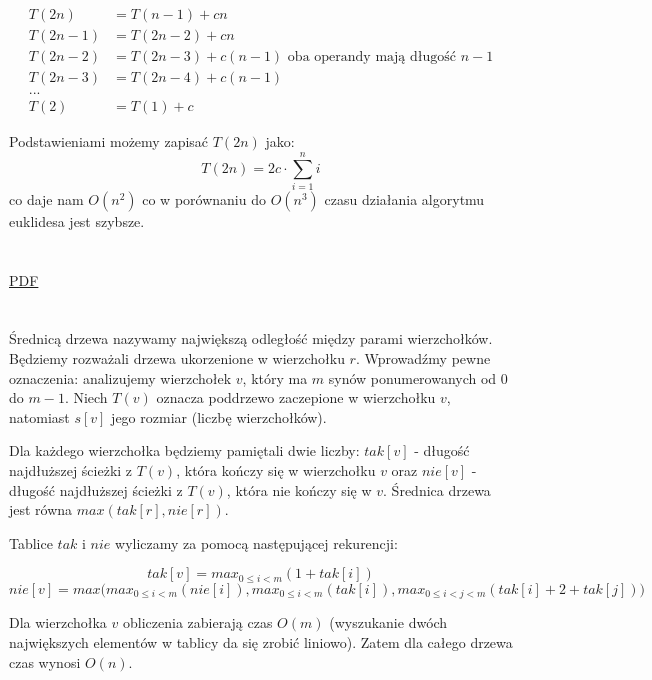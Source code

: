 \begin{equation*}
\begin{split}
T(2n) & = T(n-1) + cn \\
T(2n -1) & = T(2n - 2) + cn \\
T(2n - 2) & = T(2n - 3) + c(n-1)  \text{   oba operandy mają długość $n-1$} \\
T(2n - 3) & = T(2n - 4) + c(n-1) \\
... &  \\
T(2) &=  T(1) + c
\end{split}
\end{equation*}

Podstawieniami możemy zapisać $T(2n)$ jako:
$$ T(2n) = 2c\cdot \sum_{i=1}^n i $$
co daje nam $O(n^2)$ co w porównaniu do $O(n^3)$ czasu działania algorytmu euklidesa jest szybsze.
\section{} %
\href{https://github.com/edhell/hycaisd/raw/master/listy/2012/solutions/solutions/lista_3_zadanie_2.pdf}{PDF}

\section{} %
Średnicą drzewa nazywamy największą odległość między parami wierzchołków. Będziemy rozważali drzewa ukorzenione w wierzchołku $r$. Wprowadźmy pewne oznaczenia: analizujemy wierzchołek $v$, który ma $m$ synów ponumerowanych od $0$ do $m-1$. Niech $T(v)$ oznacza poddrzewo zaczepione w wierzchołku $v$, natomiast $s[v]$ jego rozmiar (liczbę wierzchołków).

Dla każdego wierzchołka będziemy pamiętali dwie liczby: $tak[v]$ - długość najdłuższej ścieżki z $T(v)$, która kończy się w wierzchołku $v$ oraz $nie[v]$ - długość najdłuższej ścieżki z $T(v)$, która nie kończy się w $v$. Średnica drzewa jest równa $max(tak[r], nie[r])$.

Tablice $tak$ i $nie$ wyliczamy za pomocą następującej rekurencji:

$$ tak[v] = max_{0\leq i < m}( 1 + tak[i] ) $$
$$ nie[v] = max\big( max_{0\leq i < m}( nie[i] ), max_{0\leq i < m}(tak[i]), max_{0\leq i <j<m}( tak[i]+2+tak[j]) \big) $$

Dla wierzchołka $v$ obliczenia zabierają czas $O(m)$ (wyszukanie dwóch największych elementów w tablicy da się zrobić liniowo). Zatem dla całego drzewa czas wynosi $O(n)$.

\section{} %

